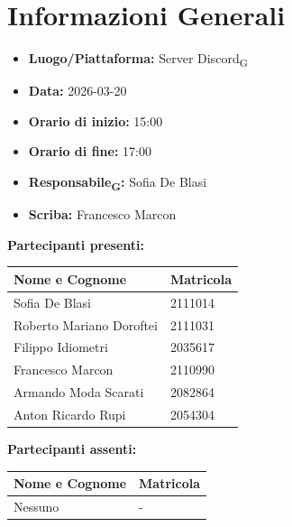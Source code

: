 \section{Informazioni Generali}
\begin{itemize}
	\item \textbf{Luogo/Piattaforma:} {Server Discord\textsubscript{G}}
	\item \textbf{Data:} 2026-03-20
	\item \textbf{Orario di inizio:} 15:00
	\item \textbf{Orario di fine:} 17:00
	\item \textbf{Responsabile\textsubscript{G}:} {Sofia De Blasi}
	\item \textbf{Scriba:} {Francesco Marcon}
\end{itemize}

\vspace{0.5cm}
\textbf{Partecipanti presenti:}
\begin{table}[ht]
	\centering
	\renewcommand{\arraystretch}{1.2}
	\begin{tabularx}{\textwidth}{X l}
		\toprule
		\textbf{Nome e Cognome} & \textbf{Matricola} \\
		\midrule
		Sofia De Blasi & 2111014 \\
		Roberto Mariano Doroftei & 2111031 \\
		Filippo Idiometri & 2035617 \\
		Francesco Marcon & 2110990 \\
		Armando Moda Scarati & 2082864 \\
		Anton Ricardo Rupi & 2054304 \\
		\bottomrule
	\end{tabularx}
\end{table}

\vspace{0.5cm}
\textbf{Partecipanti assenti:}
\begin{table}[ht]
	\centering
	\renewcommand{\arraystretch}{1.2}
	\begin{tabularx}{\textwidth}{X l}
		\toprule
		\textbf{Nome e Cognome} & \textbf{Matricola} \\
		\midrule
		Nessuno & - \\
		\bottomrule
	\end{tabularx}
\end{table}


